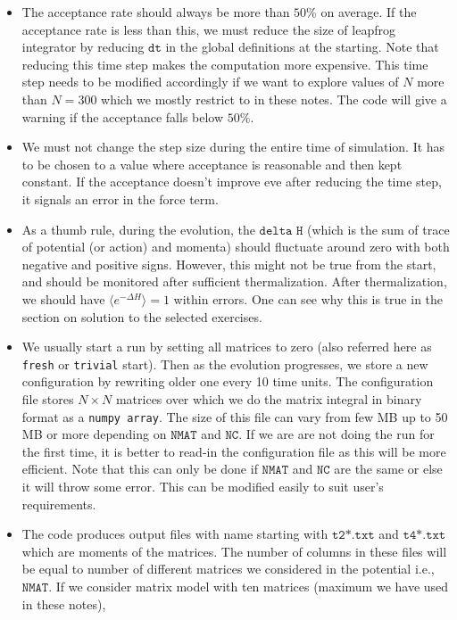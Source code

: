 \documentclass[11pt]{article}
\begin{document}
\begin{itemize} 
\item The acceptance rate should always be more than $50\%$
on average. If the acceptance rate is less than this, we
must reduce the size of leapfrog integrator by reducing 
$\texttt{dt}$ in the global definitions at the starting. Note that 
reducing this time step makes the computation more expensive. 
This time step needs to be modified accordingly if we want to explore values of $N$
more than $N = 300$ which we mostly restrict to in these notes. The code will give a warning
if the acceptance falls below $50\%$.  
\item We must not change the step size during the entire time of simulation. It has to be 
chosen to a value where acceptance is reasonable and then kept constant. If the acceptance
doesn't improve eve after reducing the time step, it signals an error in the force term.
\item As a thumb rule, during the evolution, the $\texttt{delta H}$ (which is the sum of
trace of potential (or action) and momenta) should fluctuate around zero
with both negative and positive signs. However, this might not be true from the start, and should
be monitored after sufficient thermalization. After thermalization, we should have 
$\langle e^{-\Delta H} \rangle = 1$ within errors. One can see why this is true in the section on 
solution to the selected exercises. 
\item We usually start a run by setting all matrices to zero (also referred here as \texttt{fresh} or 
\texttt{trivial} start). Then as the evolution progresses, we store a new configuration by rewriting older one
every 10 time units. The configuration file stores $N \times N$ matrices over which we do the matrix integral 
in binary format as a \texttt{numpy array}. 
The size of this file can vary from few MB up to 50 MB or more depending on 
$\texttt{NMAT}$ and $\texttt{NC}$. If we are are not doing the run for the first time, 
it is better to read-in the configuration file as this will be more efficient.  
Note that this can only be done if $\texttt{NMAT}$ and $\texttt{NC}$ are the same or else
it will throw some error. This can be modified easily to suit user's requirements. 
\item The code produces output files with name starting with $\texttt{t2*.txt}$ and $\texttt{t4*.txt}$
which are moments of the matrices. The number of columns in these files will be equal to 
number of different matrices we considered in the potential i.e., $\texttt{NMAT}$. 
If we consider matrix model with ten matrices (maximum we have used in these notes),

\end{itemize}
\end{document}
